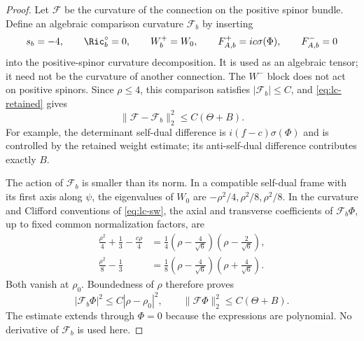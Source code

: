\begin{proof}
Let $\mathcal F$ be the curvature of the connection on the positive
spinor bundle.  Define an algebraic comparison curvature $\mathcal F_b$
by inserting
\begin{equation}\label{eq:lc-background}
 s_b=-4,\qquad \Ric_b^\circ=0,\qquad W_b^+=W_0,
 \qquad F_{A,b}^+=ic\sigma(\Phi),\qquad F_{A,b}^-=0
\end{equation}
into the positive-spinor curvature decomposition.  It is used as an
algebraic tensor; it need not be the curvature of another connection.
The $W^-$ block does not act on positive spinors.  Since $\rho\le4$,
this comparison satisfies $|\mathcal F_b|\le C$, and
\eqref{eq:lc-retained} gives
\begin{equation}\label{eq:lc-background-error}
 \|\mathcal F-\mathcal F_b\|_2^2\le C(\Theta+B).
\end{equation}
For example, the determinant self-dual difference is
$i(f-c)\sigma(\Phi)$ and is controlled by the retained weight
estimate; its anti-self-dual difference contributes exactly $B$.

The action of $\mathcal F_b$ is smaller than its norm.  In a compatible
self-dual frame with its first axis along $\psi$, the eigenvalues of
$W_0$ are $-\rho^2/4,\rho^2/8,\rho^2/8$.  In the curvature and
Clifford conventions of \eqref{eq:lc-sw}, the axial and transverse
coefficients of $\mathcal F_b\Phi$, up to fixed common normalization
factors, are
\begin{equation}\label{eq:lc-annihilation-factors}
\begin{split}
 \frac{\rho^2}{4}+\frac13-\frac{c\rho}{4}
 &=\frac14\left(\rho-\frac4{\sqrt6}\right)
               \left(\rho-\frac2{\sqrt6}\right),\\
 \frac{\rho^2}{8}-\frac13
 &=\frac18\left(\rho-\frac4{\sqrt6}\right)
               \left(\rho+\frac4{\sqrt6}\right).
\end{split}
\end{equation}
Both vanish at $\rho_0$.  Boundedness of $\rho$ therefore proves
\begin{equation}\label{eq:lc-background-annihilates}
 |\mathcal F_b\Phi|^2\le C|\rho-\rho_0|^2,
 \qquad \|\mathcal F\Phi\|_2^2\le C(\Theta+B).
\end{equation}
The estimate extends through $\Phi=0$ because the expressions are
polynomial.  No derivative of $\mathcal F_b$ is used here.


\end{proof}
